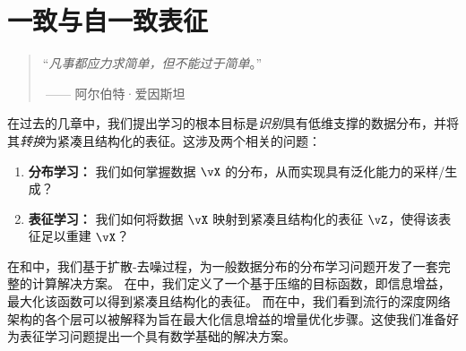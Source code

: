 \documentclass[../../book-main_zh.tex]{subfiles}
\begin{document}
\chapter{一致与自一致表征}
\label{ch:consistent-representations}

\begin{quote}
    \hfill  ``{\em 凡事都应力求简单，但不能过于简单}。''

    $~$\hfill —— 阿尔伯特·爱因斯坦
\end{quote}

\vspace{5mm}

在过去的几章中，我们提出学习的根本目标是\textit{识别}具有低维支撑的数据分布，并将其\textit{转换}为紧凑且结构化的表征。这涉及两个相关的问题：
\begin{enumerate}
    \item \textbf{分布学习：} 我们如何掌握数据 $\vX$ 的分布，从而实现具有泛化能力的采样/生成？
    \item \textbf{表征学习：} 我们如何将数据 $\vX$ 映射到紧凑且结构化的表征 $\vZ$，使得该表征足以重建 $\vX$？
\end{enumerate}
在和中，我们基于扩散-去噪过程，为一般数据分布的分布学习问题开发了一套完整的计算解决方案。 %
在中，我们定义了一个基于压缩的目标函数，即信息增益，最大化该函数可以得到紧凑且结构化的表征。
而在中，我们看到流行的深度网络架构的各个层可以被解释为旨在最大化信息增益的增量优化步骤。这使我们准备好为表征学习问题提出一个具有数学基础的解决方案。

\end{document}
